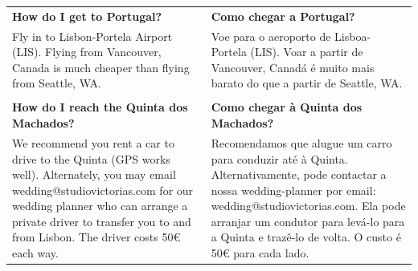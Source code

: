 \documentclass[6pt]{article}
\begin{document}
\pagestyle{empty}

\small
\begin{tabular}{p{2in}|p{2in}}
{\bf How do I get to Portugal?} & {\bf Como chegar a Portugal?}\\
  Fly in to Lisbon-Portela Airport (LIS). Flying from Vancouver, Canada is much cheaper than flying from Seattle, WA.
  &
  Voe para o aeroporto de Lisboa-Portela (LIS). Voar a partir de Vancouver, Canadá é muito mais barato do que a partir de Seattle, WA.
  \\
  &\\
  {\bf How do I reach the Quinta dos Machados?} & {\bf Como chegar à Quinta dos Machados?}\\
  We recommend you rent a car to drive to the Quinta (GPS works well). Alternately, you may email wedding@studiovictorias.com for our wedding planner who can arrange a private driver to transfer you to and from Lisbon. The driver costs 50\euro{} each way.
  &
  Recomendamos que alugue um carro para conduzir até à Quinta. Alternativamente, pode contactar a nossa wedding-planner por email: wedding@studiovictorias.com. Ela pode arranjar um condutor para levá-lo para a Quinta e trazê-lo de volta. O custo é 50\euro{} para cada lado.\\


\end{tabular}
\end{document}
